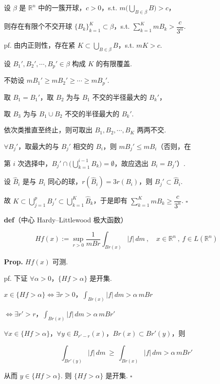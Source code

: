 \documentclass[11pt]{ctexart}
\theoremstyle{definition}
\begin{document}
设 $\beta$ 是 $\mathbb{R}^n$ 中的一簇开球，$c > 0$，s.t. $m\big(\bigcup\limits_{B \in \beta} B\big) > c$，

则存在有限个不交开球 $\{B_k\}_{k=1}^{K} \subset \beta$，s.t. $\displaystyle\sum_{k=1}^{K} mB_k > \dfrac{c}{3^n}$.

pf. 由内正则性，存在紧 $K \subset \bigcup\limits_{B \in \beta} B$，s.t. $mK > c$.

设 $B_1', B_2', \cdots, B_p' \in \beta$ 构成 $K$ 的有限覆盖.

不妨设 $mB_1' \geq mB_2' \geq \cdots \geq mB_p'$.

取 $B_1 = B_1'$，取 $B_2$ 为与 $B_1$ 不交的半径最大的 $B_k'$，

取 $B_3$ 为与 $B_1 \cup B_2$ 不交的半径最大的 $B_k'$.

依次类推直至终止，则可取出 $B_1, B_2, \cdots, B_K$ 两两不交.

$\forall B_j'$，取最大的与 $B_j'$ 相交的 $B_i$，则 $mB_j' \leq mB_i$（否则，在

第 $i$ 次选择中，$B_j' \cap \big(\bigcup\limits_{k=1}^{i-1} B_k\big) = \emptyset$，故应选出 $B_i = B_j'$）.

设 $\widehat{B}_i$ 是与 $B_i$ 同心的球，$r(\widehat{B}_i) = 3r(B_i)$，则 $B_j' \subset \widehat{B}_i$.

故 $K \subset \bigcup\limits_{j=1}^{p} B_j' \subset \bigcup\limits_{k=1}^{K} \widehat{B}_k$，于是即有 $\displaystyle\sum_{k=1}^{K} mB_k \geq \dfrac{c}{3^n}$. $\square$

\textbf{def}（中心 Hardy–Littlewood 极大函数）

\[
Hf(x) := \sup_{r > 0} \dfrac{1}{mBr} \int_{Br(x)} \vert f\vert \, dm \ ,\quad x \in \mathbb{R}^n \ ,\ f \in L(\mathbb{R}^n)
\]

\textbf{Prop.} $Hf(x)$ 可测.

pf. 下证 $\forall \alpha > 0$，$\{Hf > \alpha\}$ 是开集.

$x \in \{Hf > \alpha\} \iff \exists r > 0$，$\displaystyle\int_{Br(x)} \vert f\vert \, dm > \alpha\, mBr$

$\iff \exists r' > r$，$\displaystyle\int_{Br(x)} \vert f\vert \, dm > \alpha\, mBr'$

$\forall x \in \{Hf > \alpha\}$，$\forall y \in B_{r' - r}(x)$，$Br(x) \subset Br'(y)$，则

\[
\int_{Br'(y)} \vert f\vert \, dm \ \geq\ \int_{Br(x)} \vert f\vert \, dm > \alpha\, mBr'
\]

从而 $y \in \{Hf > \alpha\}$. 则 $\{Hf > \alpha\}$ 是开集. $\square$
\end{document}
